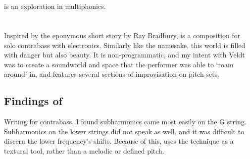 \section{\celloPiece} \label{sec:celloPiece}

\celloPiece is an exploration in multiphonics. 


\section{\bassPiece} \label{sec:bassPiece}
Inspired by the eponymous short story by Ray Bradbury, \bassPiece  is a composition for solo contrabass with electronics. 
Similarly like the namesake, this world is filled with danger but also beauty. 
It is non-programmatic, and my intent with Veldt was to create a soundworld and space that the performer was able to `roam around' in, and features several sections of improvisation on pitch-sets.

\subsection{Findings of \bassPiece}
Writing for contrabass, I found subharmonics came most easily on the G string. 
Subharmonics on the lower strings did not speak as well, and it was difficult to discern the lower frequency's shifts.
Because of this, \bassPiece uses the technique as a textural tool, rather than a melodic or defined pitch.

